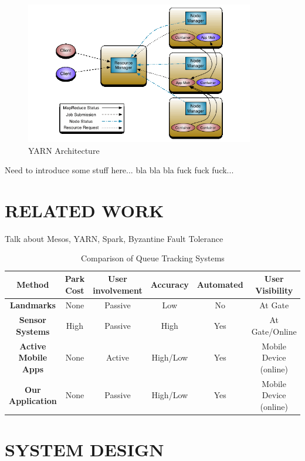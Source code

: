 \documentclass{sig-alternate}
\begin{document}
\begin{figure}
\centering
\includegraphics[width=10cm]{images/yarn_architecture.png}
\caption{YARN Architecture}
\label{fig:arch}
\end{figure}


Need to introduce some stuff here... bla bla bla fuck fuck fuck...
 
\section{RELATED WORK}
\label{sec:related}

Talk about Mesos, YARN, Spark, Byzantine Fault Tolerance





\begin{table}
\centering
\begin{tabular}{|>{\bfseries}c|c|c|c|c|c|} \hline
\textbf{Method}    &    \textbf{Park Cost}    &    \textbf{User involvement}    &    \textbf{Accuracy}    &    \textbf{Automated}    &    \textbf{User Visibility}\\ \hline
Landmarks    &    None    &    Passive    &    Low    &    No    &    At Gate\\ \hline
Sensor Systems    &    High    &    Passive    &    High    &    Yes    &    At Gate/Online\\ \hline
Active Mobile Apps    &    None    &    Active    &    High/Low    &    Yes    &    Mobile Device (online)\\ \hline
Our Application    &    None    &    Passive    &    High/Low    &    Yes    &    Mobile Device (online)\\ \hline
\end{tabular}
\caption{Comparison of Queue Tracking Systems}
\label{tab:related_work}
\end{table}
 
\section {SYSTEM DESIGN}
\label{sec:method}
\end{document}
